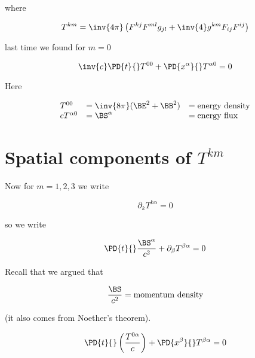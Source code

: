 where

\begin{equation}\label{eqn:relativisticElectrodynamicsL23:30}
T^{k m} = \inv{4 \pi} \left( F^{k j} F^{m l} g_{j l} + \inv{4} g^{k m} F_{i j} F^{i j} \right)
\end{equation}

last time we found for $m = 0$

\begin{equation}\label{eqn:relativisticElectrodynamicsL23:50}
\inv{c} \PD{t}{} T^{0 0} + \PD{x^\alpha}{} T^{\alpha 0} = 0
\end{equation}

Here

\begin{equation}\label{eqn:relativisticElectrodynamicsL23:70}
\begin{array}{l l l}
T^{0 0} &= \inv{8 \pi} (\BE^2 + \BB^2) &= \mbox{energy density} \\
c T^{\alpha 0} &= \BS^\alpha &= \mbox{energy flux}
\end{array}
\end{equation}

\section{Spatial components of $T^{k m}$}

Now for $m = 1,2,3$ we write

\begin{equation}\label{eqn:relativisticElectrodynamicsL23:90}
\partial_k T^{k \alpha} = 0
\end{equation}

so we write

\begin{equation}\label{eqn:relativisticElectrodynamicsL23:110}
\PD{t}{} \frac{\BS^\alpha}{c^2} + \partial_\beta T^{\beta \alpha} = 0
\end{equation}

Recall that we argued that

\begin{equation}\label{eqn:relativisticElectrodynamicsL23:130}
\frac{\BS}{c^2} = \text{momentum density}
\end{equation}

(it also comes from Noether's theorem).

\begin{equation}\label{eqn:relativisticElectrodynamicsL23:150}
\PD{t}{} \left( \frac{T^{0\alpha}}{c} \right) + \PD{x^\beta}{} T^{\beta \alpha} = 0
\end{equation}

